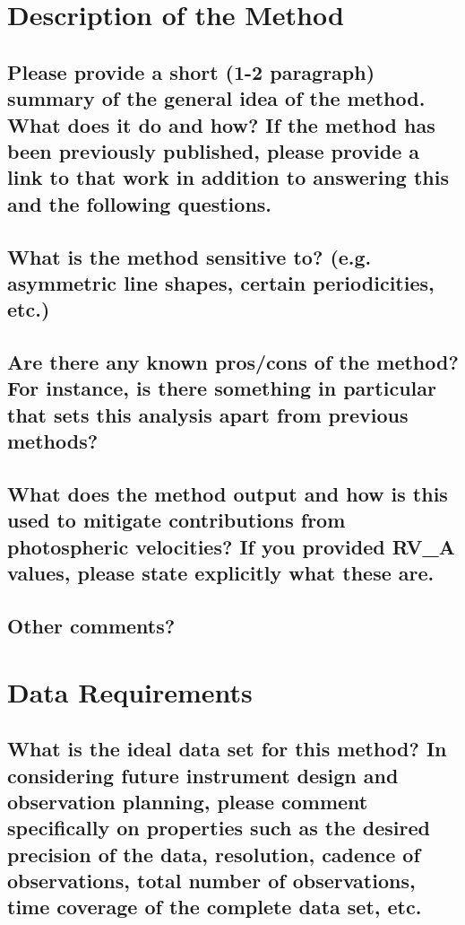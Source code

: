 \documentclass[12pt]{article}
\begin{document}
\section{Description of the Method}
\subsection{Please provide a short (1-2 paragraph) summary of the general idea of the method.  What does it do and how?  If the method has been previously published, please provide a link to that work in addition to answering this and the following questions.}


\subsection{What is the method sensitive to? (e.g. asymmetric line shapes, certain periodicities, etc.)}


\subsection{Are there any known pros/cons of the method?  For instance, is there something in particular that sets this analysis apart from previous methods?}


\subsection{What does the method output and how is this used to mitigate contributions from photospheric velocities?  If you provided RV\_A values, please state explicitly what these are.}


\subsection{Other comments?}



\section{Data Requirements}
\subsection{What is the ideal data set for this method?  In considering future instrument design and observation planning, please comment specifically on properties such as the desired precision of the data, resolution, cadence of observations, total number of observations, time coverage of the complete data set, etc.}
\end{document}
